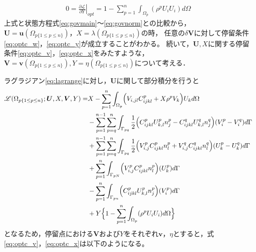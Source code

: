 \begin{align}
	0=\left.\frac{\partial \mathscr{L}}{\partial Y}\right|_{opt}=1- \sum_{p=1}^{n}\int_{\Omega_{p}}(\rho^{p}U_{i}U_{i}) d\Omega
	\label{eq:lagrange_yderivative}
\end{align}
上式と状態方程式\eqref{eq:govmain}～\eqref{eq:govnorm}との比較から，$\bm{U}=\bm{u}(\Omega_{p\{1\leq p\leq n\}})$，$X=\lambda(\Omega_{p\{1\leq p\leq n\}})$の時，
任意の$\delta \bm{V}$に対して停留条件\eqref{eq:optc_w}，\eqref{eq:optc_y}が成立することがわかる。
続いて，$\bm{U},X$に関する停留条件\eqref{eq:optc_v}，\eqref{eq:optc_x}をみたすような，
$\bm{V}=\bm{v}(\Omega_{p\{1\leq p\leq n\}}),Y=\eta(\Omega_{p\{1\leq p\leq n\}})$について考える．

ラグラジアン\eqref{eq:lagrange}に対し，$\bm{U}$に関して部分積分を行うと
\begin{align}
	\mathscr{L}(\Omega_{p\{1\leq p\leq n\}};\bm{U},X,\bm{V},Y)=&X-\sum_{p=1}^{n}\int_{\Omega_p}\Bigr(V_{i,jl}C_{ijkl}^{p}+X\rho^{p}V_{k}\Bigl)U_{k} d\Omega
	\nonumber
	\\
	&-\sum_{p=1}^{n-1}\sum_{p=q}^{n}\int_{\Gamma_{pq}}\frac{1}{2}\Bigr(C_{ijkl}^{p}U_{k,l}^{p}n_{j}^{p}-C_{ijkl}^{q}U_{k,l}^{q}n_{j}^{q}\Bigl)(V_{i}^{p}-V_{i}^{q}) d\Gamma
	\nonumber
	\\
	&+\sum_{p=1}^{n-1}\sum_{p=q}^{n}\int_{\Gamma_{pq}}\frac{1}{2}\Bigr(V_{i,j}^{p}C_{ijkl}^{p}n_{l}^{p}+V_{i,j}^{q}C_{ijkl}^{q}n_{l}^{q}\Bigl)(U_{k}^{p}-U_{k}^{q})d\Gamma
	\nonumber
	\\
	&+\sum_{p=1}^{n}\int_{\Gamma_{pN}}\Bigr(V_{i,j}^{p}C_{ijkl}^{p}n_{l}^{p}\Bigl)(U_{k}^{p}) d\Gamma
	\nonumber
	\\
	&-\sum_{p=1}^{n}\int_{\Gamma_{pu}}\Bigr(C_{ijkl}^{p}U_{k,l}^{p}n_{j}^{p}\Bigl)(V_{i}^{p}) d\Gamma
	\nonumber
	\\
	&+Y\Bigr\{1- \sum_{p=1}^{n}\int_{\Omega_{p}}(\rho^{p}U_{i}U_{i}) d\Omega \Bigl\}
	\nonumber
	\\
	\label{eq:lagrange_vint}
\end{align}
となるため，停留点における$\bm{V}$および$Y$をそれぞれ$\bm{v}$，$\eta$とすると，式\eqref{eq:optc_v}，\eqref{eq:optc_x}は以下のようになる。
